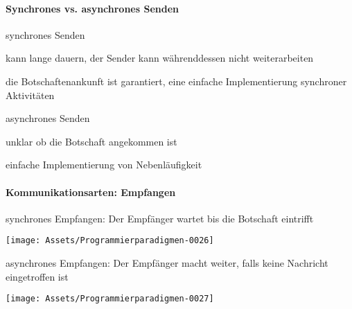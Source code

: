 \documentclass[10pt]{article}
\begin{document}
\paragraph{Synchrones vs. asynchrones Senden}
\begin{itemize*}
  \item synchrones Senden
  \begin{itemize*}
    \item kann lange dauern, der Sender kann währenddessen nicht weiterarbeiten
    \item die Botschaftenankunft ist garantiert, eine einfache Implementierung synchroner Aktivitäten
  \end{itemize*}
  \item asynchrones Senden
  \begin{itemize*}
    \item unklar ob die Botschaft angekommen ist
    \item einfache Implementierung von Nebenläufigkeit
  \end{itemize*}
\end{itemize*}

\paragraph{Kommunikationsarten: Empfangen}
\color{orange} synchrones Empfangen: \color{black} Der Empfänger wartet bis die Botschaft eintrifft
\begin{center}
  \centering
  \texttt{[image: Assets/Programmierparadigmen-0026]}
\end{center}
\color{orange} asynchrones Empfangen: \color{black} Der Empfänger macht weiter, falls keine Nachricht eingetroffen ist
\begin{center}
  \centering
  \texttt{[image: Assets/Programmierparadigmen-0027]}
\end{center}
\end{document}
